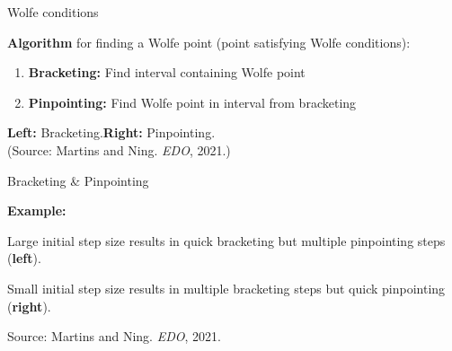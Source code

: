 \documentclass[11pt,compress,t,notes=noshow, xcolor=table]{beamer}
\begin{document}
\begin{framei}{Wolfe conditions}
\item\textbf{Algorithm} for finding a Wolfe point (point satisfying Wolfe conditions):
\begin{enumerate}
\item \textbf{Bracketing:} Find interval containing Wolfe point
\item \textbf{Pinpointing:} Find Wolfe point in interval from bracketing
\end{enumerate}
\splitVTT
{}
{}
\begin{center}{\footnotesize \textbf{Left:} Bracketing.\textbf{Right:} Pinpointing. \\
(Source: Martins and Ning. \textit{EDO}, 2021.)}
\end{center}
\end{framei}

\begin{framei}{Bracketing \& Pinpointing}
\item\textbf{Example:}
\begin{itemizeM}
\item Large initial step size results in quick bracketing but multiple pinpointing steps (\textbf{left}).
\item Small initial step size results in multiple bracketing steps but quick pinpointing (\textbf{right}).
\end{itemizeM}
\vfill
{}
\centering\footnotesize Source: Martins and Ning. \textit{EDO}, 2021.
\end{framei}
   
\endlecture
\end{document}
